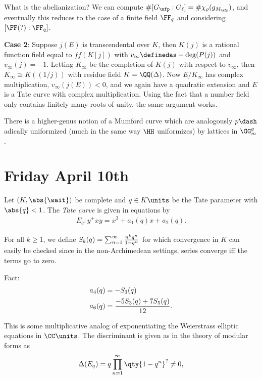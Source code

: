 \begin{description}
\hfill\break

What is the abelianization? We can compute
\(\#[G_\mfp: G_\ell] = \# \chi_\rho(g_{M_\mfp})\), and eventually this
reduces to the case of a finite field \(\FF_q\) and considering
\([\FF(?): \FF_q]\).

\textbf{Case 2}: Suppose \(j(E)\) is transcendental over \(K\), then
\(K(j)\) is a rational function field equal to \(ff(K[j])\) with
\(v_\infty \definedas -\deg(P(j))\) and \(v_\infty(j) = -1\). Letting
\(K_\infty\) be the completion of \(K(j)\) with respect to \(v_\infty\),
then \(K_\infty \cong K((1/j))\) with residue field \(K = \QQ(\Delta)\).
Now \(E/K_\infty\) has complex multiplication, \(v_\infty(j(E)) < 0\),
and we again have a quadratic extension and \(E\) is a Tate curve with
complex multiplication. Using the fact that a number field only contains
finitely many roots of unity, the same argument works.
\end{description}

There is a higher-genus notion of a Mumford curve which are analogously
\(p\dash\)adically uniformized (much in the same way \(\HH\)
uniformizes) by lattices in \(\GG_m^g\).

\hypertarget{friday-april-10th}{%
\section{Friday April 10th}\label{friday-april-10th}}

Let \((K, \abs{\wait})\) be complete and \(q\in K\units\) be the Tate
parameter with \(\abs{q} < 1\). The \emph{Tate curve} is given in
equations by \begin{align*}
E_q: y^ + xy = x^3 + a_1(q) x + a_2(q)
.\end{align*}

For all \(k\geq 1\), we define
\(S_k(q) = \sum_{n=1}^\infty {n^k q^n \over 1 - q^n}\) for which
convergence in \(K\) can easily be checked since in the non-Archimedean
settings, series converge iff the terms go to zero.

Fact: \begin{align*}
a_4(q) &= -S_3(q) \\
a_6(q) &= {-5 S_3(q) + 7 S_5(q) \over 12}
.\end{align*}

This is some multiplicative analog of exponentiating the Weierstrass
elliptic equations in \(\CC\units\). The discriminant is given as in the
theory of modular forms as \begin{align*}
\Delta (E_q) = q \prod_{n=1}^\infty \qty{1 - q^n}^{?} \neq 0
,\end{align*}

